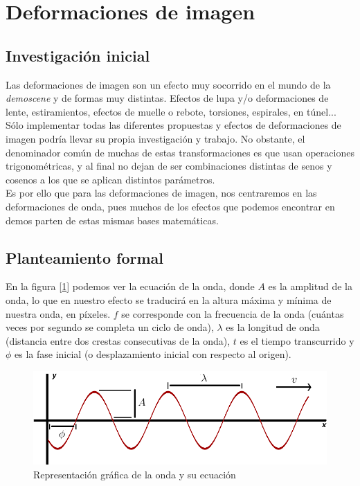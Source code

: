 \section{Deformaciones de imagen}

\subsection{Investigación inicial}

Las deformaciones de imagen son un efecto muy socorrido en el mundo de la \emph{demoscene} y de formas muy distintas. Efectos de lupa y/o deformaciones de lente, estiramientos, efectos de muelle o rebote, torsiones, espirales, en túnel...\\

Sólo implementar todas las diferentes propuestas y efectos de deformaciones de imagen podría llevar su propia investigación y trabajo. No obstante, el denominador común de muchas de estas transformaciones es que usan operaciones trigonométricas, y al final no dejan de ser combinaciones  distintas de senos y cosenos a los que se aplican distintos parámetros.\\

Es por ello que para las deformaciones de imagen, nos centraremos en las deformaciones de onda, pues muchos de los efectos que podemos encontrar en demos parten de estas mismas bases matemáticas.\\

\subsection{Planteamiento formal} \label{sec:deformaciones}

En la figura [\ref{fig:wavefunction}] podemos ver la ecuación de la onda, donde \(A\) es la amplitud de la onda, lo que en nuestro efecto se traducirá en la altura máxima y mínima de nuestra onda, en píxeles. \(f\) se corresponde con la frecuencia de la onda (cuántas veces por segundo se completa un ciclo de onda), \(\lambda\) es la longitud de onda (distancia entre dos crestas consecutivas de la onda), \(t\) es el tiempo transcurrido y \(\phi\) es la fase inicial (o desplazamiento inicial con respecto al origen).\\

\begin{figure}[h]
	\centering
	\includegraphics[width=13cm]{archivos/wave}
	\caption{Representación gráfica de la onda y su ecuación}
	\label{fig:wavefunction}
\end{figure}

